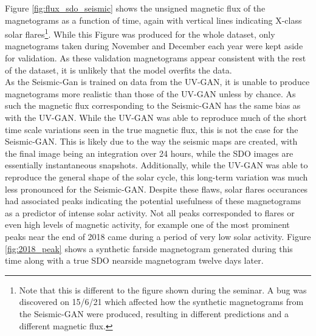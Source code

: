 \documentclass[11pt,a4paper,onecolumn]{report}
\begin{document}
Figure \ref{fig:flux_sdo_seismic} shows the unsigned magnetic flux of the
magnetograms as a function of time, again with vertical lines indicating X-class
solar flares\footnote{Note that this is different to the figure shown during the
seminar. A bug was discovered on 15/6/21 which affected how the synthetic
magnetograms from the Seismic-GAN were produced, resulting in different
predictions and a different magnetic flux.}. While this Figure was produced for
the whole dataset, only magnetograms taken during November and December each
year were kept aside for validation. As these validation magnetograms appear
consistent with the rest of the dataset, it is unlikely that the model overfits
the data.\\

As the Seismic-Gan is trained on data from the UV-GAN, it is unable to produce
magnetograms more realistic than those of the UV-GAN unless by chance. As such
the magnetic flux corresponding to the Seismic-GAN has the same bias as with the
UV-GAN. While the UV-GAN was able to reproduce much of the short time scale
variations seen in the true magnetic flux, this is not the case for the
Seismic-GAN. This is likely due to the way the seismic maps are created, with
the final image being an integration over 24 hours, while the SDO images are
essentially instantaneous snapshots. Additionally, while the UV-GAN was able to
reproduce the general shape of the solar cycle, this long-term variation was
much less pronounced for the Seismic-GAN. Despite these flaws, solar flares
occurances had associated peaks indicating the potential usefulness of these
magnetograms as a predictor of intense solar activity. Not all peaks
corresponded to flares or even high levels of magnetic activity, for example one
of the most prominent peaks near the end of 2018 came during a period of very
low solar activity. Figure \ref{fig:2018_peak} shows a synthetic farside
magnetogram generated during this time along with a true SDO nearside
magnetogram twelve days later.
\end{document}
